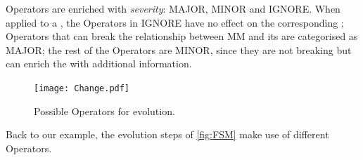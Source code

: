 \textsf{Operator}s are enriched with \emph{severity}: \textsf{MAJOR}, 
\textsf{MINOR} and \textsf{IGNORE}. 
When applied to a \metamodel, the \textsf{Operator}s in \textsf{IGNORE} have no 
effect on the corresponding \viewtypes; \textsf{Operator}s that can break the 
relationship between \textsf{MM} and its \viewtypes are categorised as \textsf{MAJOR}; 
the rest of the \textsf{Operator}s are \textsf{MINOR}, since they are not 
breaking but can enrich the \viewtypes with additional information.

\begin{figure}[t]
    \centering
    \texttt{[image: Change.pdf]}
    \caption{Possible \textsf{Operator}s for \metamodel evolution.}
    \label{fig:Operator}
\end{figure}

Back to our example, the evolution steps of \cref{fig:FSM} make use of different \textsf{Operator}s.
